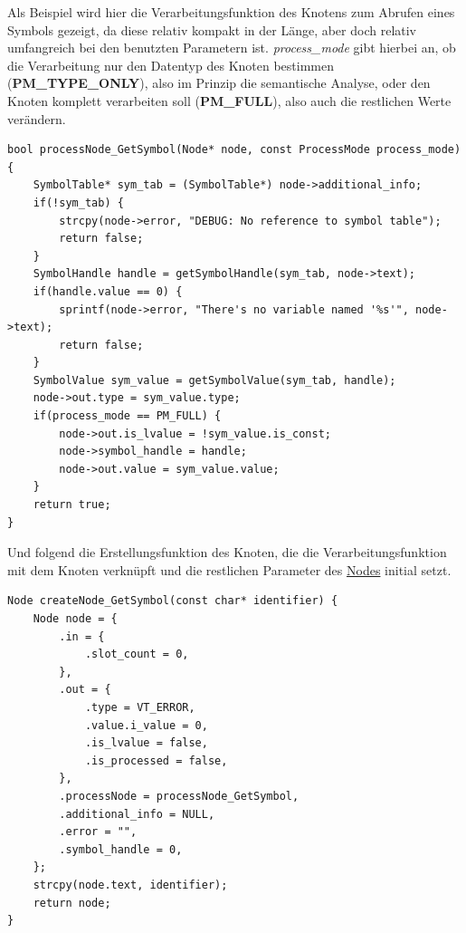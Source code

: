 \documentclass[oneside]{ausarbeitung}
\begin{document}
Als Beispiel wird hier die Verarbeitungsfunktion des Knotens zum Abrufen eines Symbols gezeigt, da diese relativ kompakt in der Länge, aber doch relativ umfangreich bei den benutzten Parametern ist. \textit{process\_mode} gibt hierbei an, ob die Verarbeitung nur den Datentyp des Knoten bestimmen (\textbf{PM\_TYPE\_ONLY}), also im Prinzip die semantische Analyse, oder den Knoten komplett verarbeiten soll (\textbf{PM\_FULL}), also auch die restlichen Werte verändern.
\begin{lstlisting}[label={lst:processNode}, caption={processNode\_GetSymbol}]
bool processNode_GetSymbol(Node* node, const ProcessMode process_mode) {
    SymbolTable* sym_tab = (SymbolTable*) node->additional_info;
    if(!sym_tab) {
        strcpy(node->error, "DEBUG: No reference to symbol table");
        return false;
    }
    SymbolHandle handle = getSymbolHandle(sym_tab, node->text);
    if(handle.value == 0) {
        sprintf(node->error, "There's no variable named '%s'", node->text);
        return false;
    }
    SymbolValue sym_value = getSymbolValue(sym_tab, handle);
    node->out.type = sym_value.type;
    if(process_mode == PM_FULL) {
        node->out.is_lvalue = !sym_value.is_const; 
        node->symbol_handle = handle;
        node->out.value = sym_value.value;
    }
    return true;
}
\end{lstlisting}
Und folgend die Erstellungsfunktion des Knoten, die die Verarbeitungsfunktion mit dem Knoten verknüpft und die restlichen Parameter des \hyperref[lst:Node]{Nodes} initial setzt.
\begin{lstlisting}[label={lst:createNode}, caption={createNode\_GetSymbol}]
Node createNode_GetSymbol(const char* identifier) {
    Node node = {
        .in = {
            .slot_count = 0,
        }, 
        .out = {
            .type = VT_ERROR,
            .value.i_value = 0,
            .is_lvalue = false,
            .is_processed = false,
        },
        .processNode = processNode_GetSymbol,
        .additional_info = NULL,
        .error = "",
        .symbol_handle = 0,
    };
    strcpy(node.text, identifier);
    return node;
}
\end{lstlisting}
\end{document}
